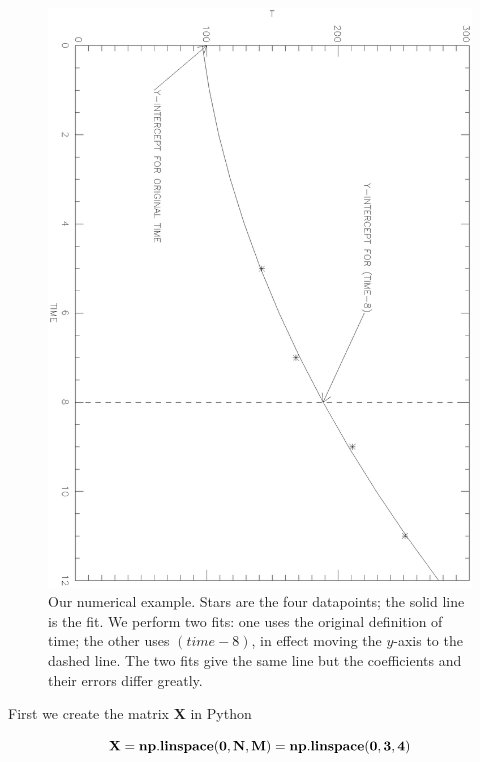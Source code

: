 \documentclass[psfig,preprint]{aastex}
\begin{document}
\begin{figure}[h!]
\begin{center}
\leavevmode
\includegraphics[scale=.55, angle=90]{lsfitfig.ps}
\end{center}
\caption{Our numerical example. Stars are the four datapoints; the solid
line is the fit. We perform two fits: one uses the original definition
of time; the other uses $(time-8)$, in effect moving the $y$-axis to the
dashed line. The two fits give the same line but the coefficients and
their errors differ greatly.\label{lsfitfig}}
\end{figure}

	First we create the matrix {\bf X} in Python

\begin{equation}
{\bf X = np.linspace(0,N,M) = np.linspace(0,3,4)}
\end{equation}
	
\end{document}

